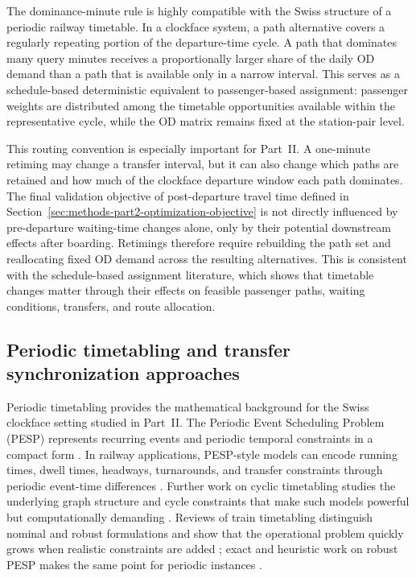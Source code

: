 \documentclass[preprint,12pt]{elsarticle}
\begin{document}
The dominance-minute rule is highly compatible with the Swiss structure of a periodic railway timetable. In a clockface system, a path alternative covers a regularly repeating portion of the departure-time cycle. A path that dominates many query minutes receives a proportionally larger share of the daily OD demand than a path that is available only in a narrow interval. This serves as a schedule-based deterministic equivalent to passenger-based assignment: passenger weights are distributed among the timetable opportunities available within the representative cycle, while the OD matrix remains fixed at the station-pair level.

This routing convention is especially important for Part~II. A one-minute retiming may change a transfer interval, but it can also change which paths are retained and how much of the clockface departure window each path dominates. The final validation objective of post-departure travel time defined in Section~\ref{sec:methods-part2-optimization-objective} is not directly influenced by pre-departure waiting-time changes alone, only by their potential downstream effects after boarding. Retimings therefore require rebuilding the path set and reallocating fixed OD demand across the resulting alternatives. This is consistent with the schedule-based assignment literature, which shows that timetable changes matter through their effects on feasible passenger paths, waiting conditions, transfers, and route allocation.

\subsection{Periodic timetabling and transfer synchronization approaches}\label{sec:periodic-timetabling}

Periodic timetabling provides the mathematical background for the Swiss clockface setting studied in Part~II. The Periodic Event Scheduling Problem (PESP) represents recurring events and periodic temporal constraints in a compact form \citep{serafini1989periodic}. In railway applications, PESP-style models can encode running times, dwell times, headways, turnarounds, and transfer constraints through periodic event-time differences \citep{liebchen2007pesp}. Further work on cyclic timetabling studies the underlying graph structure and cycle constraints that make such models powerful but computationally demanding \citep{liebchenPeeters2009CycleBases}. Reviews of train timetabling distinguish nominal and robust formulations and show that the operational problem quickly grows when realistic constraints are added \citep{cacchianiToth2012Timetabling}; exact and heuristic work on robust PESP makes the same point for periodic instances \citep{goerigk2015RobustPESP}.
\end{document}
